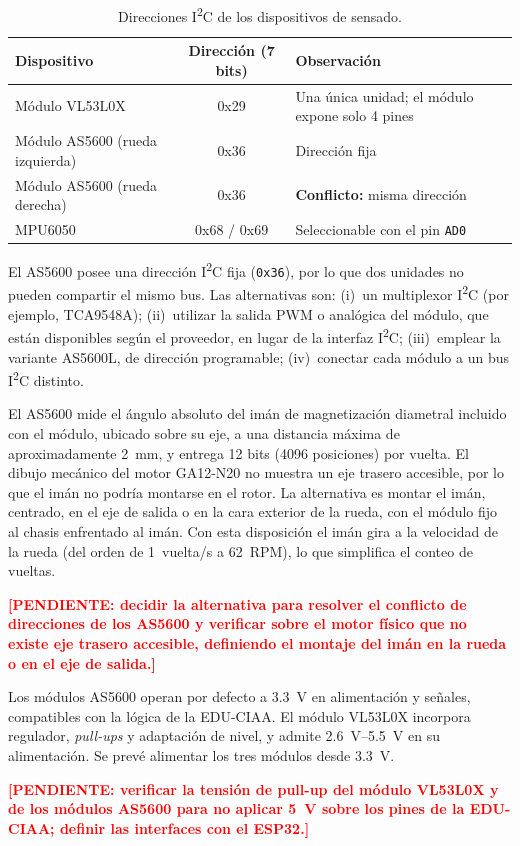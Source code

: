 \documentclass[12pt,a4paper]{article}
\newcommand{\pendiente}[1]{\textcolor{red}{\textbf{[PENDIENTE: #1]}}}
\newcommand{\vr}{\rowcolor{yellow!50}}
\begin{document}
\begin{table}[H]
\centering
\caption{Direcciones I\textsuperscript{2}C de los dispositivos de sensado.}
\label{tab:i2c}
\small
\begin{tabular}{L{3.8cm}cL{5.6cm}}
\toprule
Dispositivo & Dirección (7 bits) & Observación \\
\midrule
\vr Módulo VL53L0X & 0x29 & Una única unidad; el módulo expone solo 4 pines \\
\vr Módulo AS5600 (rueda izquierda) & 0x36 & Dirección fija \\
\vr Módulo AS5600 (rueda derecha) & 0x36 & \textbf{Conflicto:} misma dirección \\
\vr MPU6050 & 0x68 / 0x69 & Seleccionable con el pin \texttt{AD0} \\
\bottomrule
\end{tabular}
\end{table}

\begin{visar}
El AS5600 posee una dirección I\textsuperscript{2}C fija (\texttt{0x36}), por lo que dos unidades no pueden compartir el mismo bus. Las alternativas son: (i)~un multiplexor I\textsuperscript{2}C (por ejemplo, TCA9548A); (ii)~utilizar la salida PWM o analógica del módulo, que están disponibles según el proveedor, en lugar de la interfaz I\textsuperscript{2}C; (iii)~emplear la variante AS5600L, de dirección programable; (iv)~conectar cada módulo a un bus I\textsuperscript{2}C distinto.

El AS5600 mide el ángulo absoluto del imán de magnetización diametral incluido con el módulo, ubicado sobre su eje, a una distancia máxima de aproximadamente \SI{2}{mm}, y entrega 12 bits (4096 posiciones) por vuelta. El dibujo mecánico del motor GA12-N20 no muestra un eje trasero accesible, por lo que el imán no podría montarse en el rotor. La alternativa es montar el imán, centrado, en el eje de salida o en la cara exterior de la rueda, con el módulo fijo al chasis enfrentado al imán. Con esta disposición el imán gira a la velocidad de la rueda (del orden de \SI{1}{vuelta/s} a \SI{62}{RPM}), lo que simplifica el conteo de vueltas.
\end{visar}
\pendiente{decidir la alternativa para resolver el conflicto de direcciones de los AS5600 y verificar sobre el motor físico que no existe eje trasero accesible, definiendo el montaje del imán en la rueda o en el eje de salida.}

\begin{visar}
Los módulos AS5600 operan por defecto a \SI{3,3}{V} en alimentación y señales, compatibles con la lógica de la EDU-CIAA. El módulo VL53L0X incorpora regulador, \emph{pull-ups} y adaptación de nivel, y admite \SI{2,6}{V}--\SI{5,5}{V} en su alimentación. Se prevé alimentar los tres módulos desde \SI{3,3}{V}.
\end{visar}
\pendiente{verificar la tensión de pull-up del módulo VL53L0X y de los módulos AS5600 para no aplicar \SI{5}{V} sobre los pines de la EDU-CIAA; definir las interfaces con el ESP32.}
\end{document}
